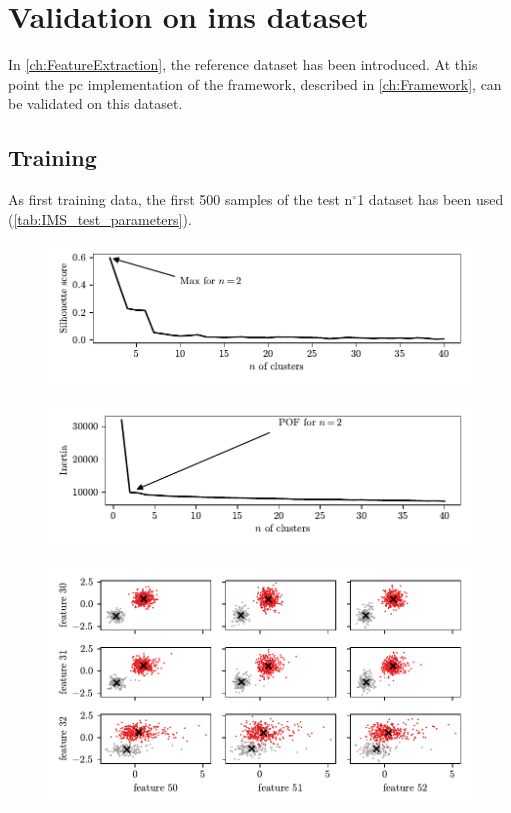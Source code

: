 \section{Validation on \gls{ims} dataset}
\label{sec:ValidationOnRealWorldData}

In \autoref{ch:FeatureExtraction}, the reference dataset \cite{lee2007bearingdataset} has been introduced. At this point the \gls{pc} implementation of the framework, described in \autoref{ch:Framework}, can be validated on this dataset. 

\subsection{Training}

As first training data, the first 500 samples of the test $\text{n}^\circ$1 dataset has been used (\autoref{tab:IMS_test_parameters}).


\begin{figure}
    \centering
    \includegraphics{images/IMS/SilScore_01.pdf}
\end{figure}

\begin{figure}
    \centering
    \includegraphics{images/IMS/InertiaScore_01.pdf}
\end{figure}

\begin{figure}
    \centering
    \includegraphics{images/IMS/Clusters.pdf}
\end{figure}